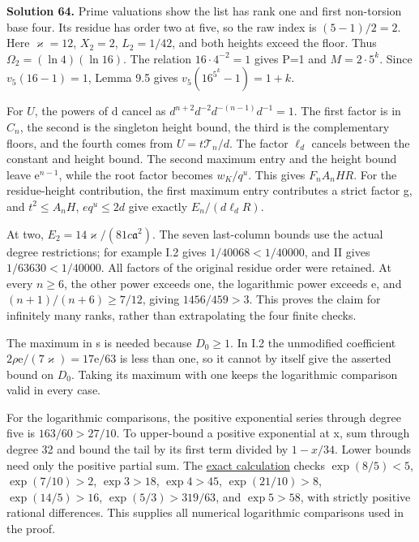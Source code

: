 \documentclass[
  11pt,
  a4paper,
]{article}
\begin{document}
\textbf{Solution 64.} Prime valuations show the list has rank one and
first non-torsion base four. Its residue has order two at five, so the
raw index is \((5-1)/2=2\). Here \(\varkappa=12\), \(X_2=2\),
\(L_2=1/42\), and both heights exceed the floor. Thus
\(\Omega_2=(\ln4)(\ln16)\). The relation \(16\cdot4^{-2}=1\) gives P=1
and \(M=2\cdot5^k\). Since \(v_5(16-1)=1\), Lemma 9.5 gives
\(v_5(16^{5^k}-1)=1+k\).

For \(U\), the powers of d cancel as
\(d^{n+2}d^{-2}d^{-(n-1)}d^{-1}=1\). The first factor is in \(C_n\), the
second is the singleton height bound, the third is the complementary
floors, and the fourth comes from \(U=t\mathcal
T_n/d\). The factor \(\ell_d\) cancels between the constant and height
bound. The second maximum entry and the height bound leave
\(\mathrm e^{n-1}\), while the root factor becomes \(w_K/q^u\). This
gives \(F_nA_nHR\). For the residue-height contribution, the first
maximum entry contributes a strict factor g, and \(t^2\le A_nH\),
\(eq^u\le2d\) give exactly \(E_n/(d\ell_dR)\).

At two, \(E_2=14\varkappa/(81c\mathfrak a^2)\). The seven last-column
bounds use the actual degree restrictions; for example I.2 gives
\(1/40068<1/40000\), and II gives \(1/63630<1/40000\). All factors of
the original residue order were retained. At every \(n\ge6\), the other
power exceeds one, the logarithmic power exceeds \(\mathrm e\), and
\((n+1)/(n+6)\ge7/12\), giving \(1456/459>3\). This proves the claim for
infinitely many ranks, rather than extrapolating the four finite checks.

The maximum in s is needed because \(D_0\ge1\). In I.2 the unmodified
coefficient \(2\rho\mathrm e/(7\varkappa)=17\mathrm
e/63\) is less than one, so it cannot by itself give the asserted bound
on \(D_0\). Taking its maximum with one keeps the logarithmic comparison
valid in every case.

For the logarithmic comparisons, the positive exponential series through
degree five is \(163/60>27/10\). To upper-bound a positive exponential
at x, sum through degree 32 and bound the tail by its first term divided
by \(1-x/34\). Lower bounds need only the positive partial sum. The
\href{../figure_sources/yu_rank_one_refinement_enclosures.py}{exact
calculation} checks \(\exp(8/5)<5\), \(\exp(7/10)>2\), \(\exp3>18\),
\(\exp4>45\), \(\exp(21/10)>8\), \(\exp(14/5)>16\),
\(\exp(5/3)>319/63\), and \(\exp5>58\), with strictly positive rational
differences. This supplies all numerical logarithmic comparisons used in
the proof.
\end{document}
